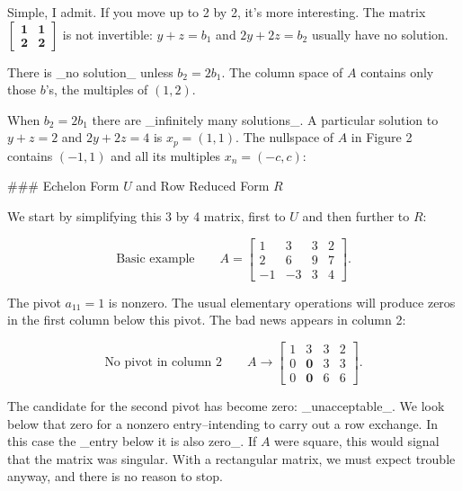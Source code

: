 Simple, I admit. If you move up to 2 by 2, it's more interesting. The matrix \(\left[\begin{matrix}\mathbf{1}&\mathbf{1}\\ \mathbf{2}&\mathbf{2}\end{matrix}\right]\) is not invertible: \(y+z=b_{1}\) and \(2y+2z=b_{2}\) usually have no solution.

There is _no solution_ unless \(b_{2}=2b_{1}\). The column space of \(A\) contains only those \(b\)'s, the multiples of \((1,2)\).

When \(b_{2}=2b_{1}\) there are _infinitely many solutions_. A particular solution to \(y+z=2\) and \(2y+2z=4\) is \(x_{p}=(1,1)\). The nullspace of \(A\) in Figure 2 contains \((-1,1)\) and all its multiples \(x_{n}=(-c,c)\):

### Echelon Form \(U\) and Row Reduced Form \(R\)

We start by simplifying this 3 by 4 matrix, first to \(U\) and then further to \(R\):

\[\text{Basic example}\qquad A=\begin{bmatrix}1&3&3&2\\ 2&6&9&7\\ -1&-3&3&4\end{bmatrix}.\]

The pivot \(a_{11}=1\) is nonzero. The usual elementary operations will produce zeros in the first column below this pivot. The bad news appears in column 2:

\[\text{No pivot in column 2}\qquad A\to\begin{bmatrix}1&3&3&2\\ 0&\mathbf{0}&3&3\\ 0&\mathbf{0}&6&6\end{bmatrix}.\]

The candidate for the second pivot has become zero: _unacceptable_. We look below that zero for a nonzero entry--intending to carry out a row exchange. In this case the _entry below it is also zero_. If \(A\) were square, this would signal that the matrix was singular. With a rectangular matrix, we must expect trouble anyway, and there is no reason to stop.

 